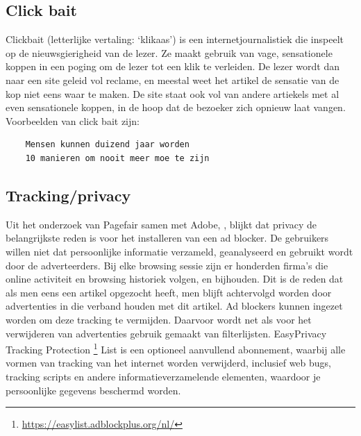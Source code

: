 \documentclass[pdftex,a4paper,12pt,twoside]{report}
\begin{document}
\subsection{Click bait}
\label{sec click bait}
Clickbait (letterlijke vertaling: ‘klikaas’) is een internetjournalistiek die inspeelt op de nieuwsgierigheid van de lezer. Ze maakt gebruik van vage, sensationele koppen in een poging om de lezer tot een klik te verleiden. De lezer wordt dan naar een site geleid vol reclame, en meestal weet het artikel de sensatie van de kop niet eens waar te maken. De site staat ook vol van andere artiekels met al even sensationele koppen, in de hoop dat de bezoeker zich opnieuw laat vangen.
\\
Voorbeelden van click bait zijn:
\begin{lstlisting}
	Mensen kunnen duizend jaar worden
	10 manieren om nooit meer moe te zijn
\end{lstlisting}


\subsection{Tracking/privacy}
\label{sec tracking/privacy}
Uit het onderzoek van Pagefair samen met Adobe, \cite{PageFair2015}, blijkt dat privacy de belangrijkste reden is voor het installeren van een ad blocker. De gebruikers willen niet dat persoonlijke informatie verzameld, geanalyseerd en gebruikt wordt door de adverteerders. Bij elke browsing sessie zijn er honderden firma's die online activiteit en browsing historiek volgen, en bijhouden. Dit is de reden dat als men eens een artikel opgezocht heeft, men blijft achtervolgd worden door advertenties in die verband houden met dit artikel. Ad blockers kunnen ingezet worden om deze tracking te vermijden. Daarvoor wordt net als voor het verwijderen van advertenties gebruik gemaakt van filterlijsten. EasyPrivacy Tracking Protection \footnote{\url{https://easylist.adblockplus.org/nl/}} List is een optioneel aanvullend abonnement, waarbij alle vormen van tracking van het internet worden verwijderd, inclusief web bugs, tracking scripts en andere informatieverzamelende elementen, waardoor je persoonlijke gegevens beschermd worden.
\end{document}
